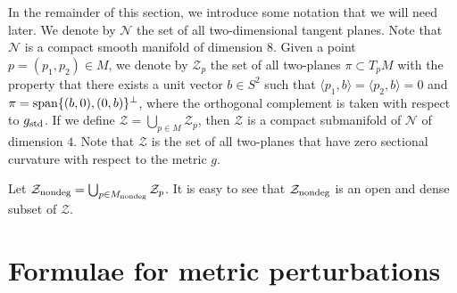 \documentclass[11pt]{amsart}
\theoremstyle{definition}
\begin{document}
In the remainder of this section, we introduce some notation that we will need later. We denote by $\mathcal{N}$ the set of all two-dimensional tangent planes. Note that $\mathcal{N}$ is a compact smooth manifold of dimension $8$. Given a point $p = (p_1,p_2) \in M$, we denote by $\mathcal{Z}_p$ the set of all two-planes $\pi \subset T_p M$ with the property that there exists a unit vector $b \in S^2$ such that $\langle p_1,b \rangle = \langle p_2,b \rangle = 0$ and $\pi = \text{\rm span}\{(b,0),(0,b)\}^\perp$, where the orthogonal complement is taken with respect to $g_{\text{\rm std}}$. If we define $\mathcal{Z} = \bigcup_{p \in M} \mathcal{Z}_p$, then $\mathcal{Z}$ is a compact submanifold of $\mathcal{N}$ of dimension $4$. Note that $\mathcal{Z}$ is the set of all two-planes that have zero sectional curvature with respect to the metric $g$.

Let $\mathcal{Z}_{\text{\rm nondeg}} = \bigcup_{p \in M_{\text{\rm nondeg}}} \mathcal{Z}_p$. It is easy to see that $\mathcal{Z}_{\text{\rm nondeg}}$ is an open and dense subset of $\mathcal{Z}$. \\

\section{Formulae for metric perturbations}

\label{sec:formula.metric.perturbation}
\end{document}
